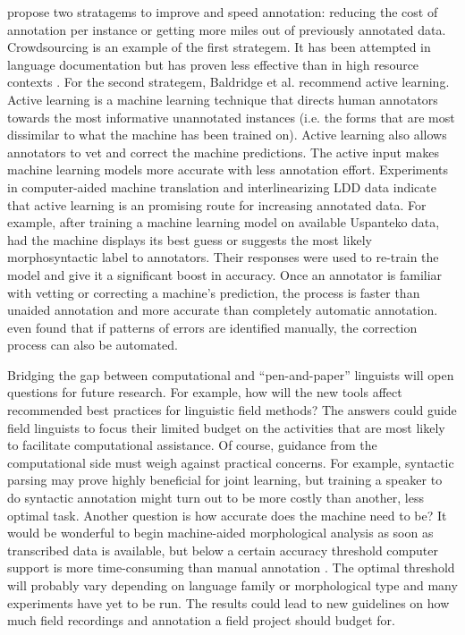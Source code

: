 \documentclass[12pt]{article}
\begin{document}
 propose two stratagems to improve and speed annotation: reducing the cost of annotation per instance or getting more miles out of previously annotated data. Crowdsourcing is an example of the first strategem. It has been attempted in language documentation but has proven less effective than in high resource contexts \cite{bird_aikuma:_2014,bettinson_developing_2017}. For the second strategem, Baldridge et al. recommend active learning. Active learning is a machine learning technique that directs human annotators towards the most informative unannotated instances (i.e. the forms that are most dissimilar to what the machine has been trained on). Active learning also allows annotators to vet and correct the machine predictions. The active input makes machine learning models more accurate with less annotation effort. Experiments in computer-aided machine translation \cite{kothur_document-level_2018} and interlinearizing LDD data \cite{palmer_semi-automated_2009,palmer_evaluating_2009,palmer_computational_2010} indicate that active learning is an promising route for increasing annotated data. For example, after training a machine learning model on available Uspanteko data,  had the machine displays its best guess or suggests the most likely morphosyntactic label to annotators. Their responses were used to re-train the model and give it a significant boost in accuracy. Once an annotator is familiar with vetting or correcting a machine’s prediction, the process is faster than unaided annotation and more accurate than completely automatic annotation.  even found that if patterns of errors are identified manually, the correction process can also be automated.

Bridging the gap between computational and ``pen-and-paper'' linguists will open questions for future research. For example, how will the new tools affect recommended best practices for linguistic field methods? The answers could guide field linguists to focus their limited budget on the activities that are most likely to facilitate computational assistance. Of course, guidance from the computational side must weigh against practical concerns. For example, syntactic parsing may prove highly beneficial for joint learning, but training a speaker to do syntactic annotation might turn out to be more costly than another, less optimal task. Another question is how accurate does the machine need to be? It would be wonderful to begin machine-aided morphological analysis as soon as transcribed data is available, but below a certain accuracy threshold computer support is more time-consuming than manual annotation \cite{kothur_document-level_2018,palmer_semi-automated_2009}. The optimal threshold will probably vary depending on language family or morphological type and many experiments have yet to be run. The results could lead to new guidelines on how much field recordings and annotation a field project should budget for.
\end{document}
